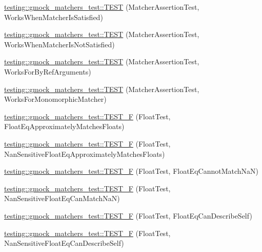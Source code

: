 \begin{DoxyCompactItemize}
\item 
\hyperlink{namespacetesting_1_1gmock__matchers__test_ad37559f9112c04334a62ce9617cf1349}{testing\+::gmock\+\_\+matchers\+\_\+test\+::\+T\+E\+ST} (Matcher\+Assertion\+Test, Works\+When\+Matcher\+Is\+Satisfied)
\item 
\hyperlink{namespacetesting_1_1gmock__matchers__test_a2f3755be7052d6e7769e3323053399d0}{testing\+::gmock\+\_\+matchers\+\_\+test\+::\+T\+E\+ST} (Matcher\+Assertion\+Test, Works\+When\+Matcher\+Is\+Not\+Satisfied)
\item 
\hyperlink{namespacetesting_1_1gmock__matchers__test_afcf1287c7fd759157367026613ddd727}{testing\+::gmock\+\_\+matchers\+\_\+test\+::\+T\+E\+ST} (Matcher\+Assertion\+Test, Works\+For\+By\+Ref\+Arguments)
\item 
\hyperlink{namespacetesting_1_1gmock__matchers__test_a0fe4bde05f667c4877e3b4a4a7bde002}{testing\+::gmock\+\_\+matchers\+\_\+test\+::\+T\+E\+ST} (Matcher\+Assertion\+Test, Works\+For\+Monomorphic\+Matcher)
\item 
\hyperlink{namespacetesting_1_1gmock__matchers__test_a69257e935b4334c835b3ad26acea9104}{testing\+::gmock\+\_\+matchers\+\_\+test\+::\+T\+E\+S\+T\+\_\+F} (Float\+Test, Float\+Eq\+Approximately\+Matches\+Floats)
\item 
\hyperlink{namespacetesting_1_1gmock__matchers__test_abb691880cd22f6f444c978547b13f792}{testing\+::gmock\+\_\+matchers\+\_\+test\+::\+T\+E\+S\+T\+\_\+F} (Float\+Test, Nan\+Sensitive\+Float\+Eq\+Approximately\+Matches\+Floats)
\item 
\hyperlink{namespacetesting_1_1gmock__matchers__test_a111f0c8a5ec17b47e8eb6226e1c2cb58}{testing\+::gmock\+\_\+matchers\+\_\+test\+::\+T\+E\+S\+T\+\_\+F} (Float\+Test, Float\+Eq\+Cannot\+Match\+NaN)
\item 
\hyperlink{namespacetesting_1_1gmock__matchers__test_a4e9d89902e088a10915b4f9463ac0f09}{testing\+::gmock\+\_\+matchers\+\_\+test\+::\+T\+E\+S\+T\+\_\+F} (Float\+Test, Nan\+Sensitive\+Float\+Eq\+Can\+Match\+NaN)
\item 
\hyperlink{namespacetesting_1_1gmock__matchers__test_a264de01a5019e5c358116845bf5edd14}{testing\+::gmock\+\_\+matchers\+\_\+test\+::\+T\+E\+S\+T\+\_\+F} (Float\+Test, Float\+Eq\+Can\+Describe\+Self)
\item 
\hyperlink{namespacetesting_1_1gmock__matchers__test_a95a2bbc273ff70fc364c5c9c4697834c}{testing\+::gmock\+\_\+matchers\+\_\+test\+::\+T\+E\+S\+T\+\_\+F} (Float\+Test, Nan\+Sensitive\+Float\+Eq\+Can\+Describe\+Self)
\item 

\end{DoxyCompactItemize}
